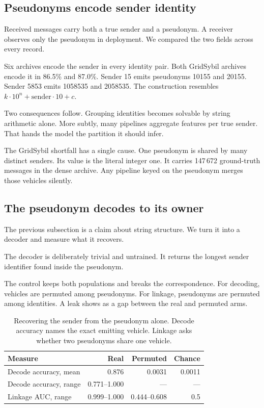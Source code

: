 \documentclass[conference]{IEEEtran}
\begin{document}
\subsection{Pseudonyms encode sender identity}

Received messages carry both a true sender and a pseudonym.
A receiver observes only the pseudonym in deployment.
We compared the two fields across every record.

Six archives encode the sender in every identity pair.
Both GridSybil archives encode it in 86.5\% and 87.0\%.
Sender 15 emits pseudonyms 10155 and 20155.
Sender 5853 emits 1058535 and 2058535.
The construction resembles $k\cdot10^{n}+\text{sender}\cdot10+c$.

Two consequences follow.
Grouping identities becomes solvable by string arithmetic alone.
More subtly, many pipelines aggregate features per true sender.
That hands the model the partition it should infer.

The GridSybil shortfall has a single cause.
One pseudonym is shared by many distinct senders.
Its value is the literal integer one.
It carries 147\,672 ground-truth messages in the dense archive.
Any pipeline keyed on the pseudonym merges those vehicles silently.

\subsection{The pseudonym decodes to its owner}

The previous subsection is a claim about string structure.
We turn it into a decoder and measure what it recovers.

The decoder is deliberately trivial and untrained.
It returns the longest sender identifier found inside the pseudonym.

The control keeps both populations and breaks the correspondence.
For decoding, vehicles are permuted among pseudonyms.
For linkage, pseudonyms are permuted among identities.
A leak shows as a gap between the real and permuted arms.

\begin{table}[t]
\caption{Recovering the sender from the pseudonym alone.
Decode accuracy names the exact emitting vehicle.
Linkage asks whether two pseudonyms share one vehicle.}
\label{tab:decode}
\centering
\footnotesize
\begin{tabular}{@{}lrrr@{}}
\toprule
Measure & Real & Permuted & Chance \\
\midrule
Decode accuracy, mean & 0.876 & 0.0031 & 0.0011 \\
Decode accuracy, range & 0.771--1.000 & --- & --- \\
Linkage AUC, range & 0.999--1.000 & 0.444--0.608 & 0.5 \\
\bottomrule
\end{tabular}
\end{table}
\end{document}
